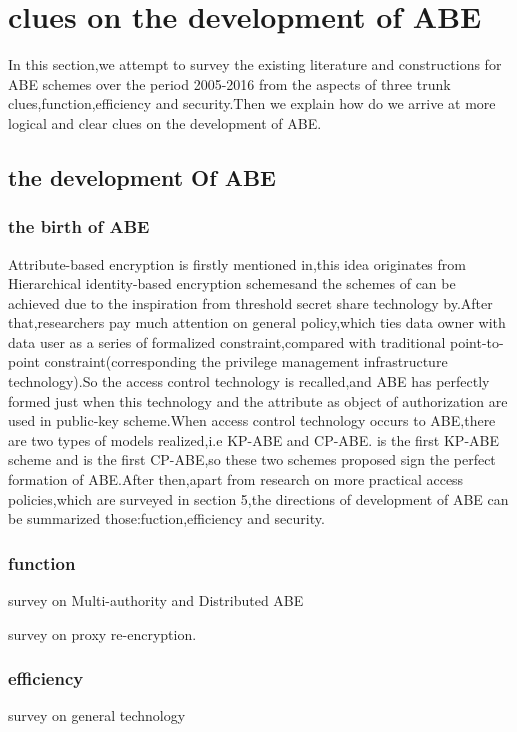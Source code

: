\section{clues on the development of ABE}
In this section,we attempt to survey the existing literature and constructions for ABE schemes over the period 2005-2016 from the aspects of three trunk clues,function,efficiency and security.Then we explain how do we arrive at more  logical and clear clues on the development of ABE.
\subsection{the development Of ABE}
\subsubsection{the birth of ABE}Attribute-based encryption is firstly mentioned in\cite{fuzz},this idea originates from Hierarchical identity-based encryption schemes\cite{Yao:Id-based encryption for complex hierarchies with applications to forward security and broadcast encryption}and the schemes of \cite{fuzz} can be achieved due to the inspiration from threshold secret share technology by\cite{ Adi Shamir:How to Share a Secret}.After that,researchers pay much attention on general policy,which ties data owner with data user as a series of formalized constraint,compared with traditional point-to-point constraint(corresponding the privilege management infrastructure technology).So the access control technology is recalled,and ABE has perfectly formed just when this technology and the attribute as object of authorization are used in public-key scheme.When access control technology occurs to ABE,there are two types of models realized,i.e KP-ABE and CP-ABE.\cite{classical:KP-ABE} is the first KP-ABE scheme and \cite{first:CP-ABE} is the first CP-ABE,so these two schemes proposed sign the perfect formation of ABE.After then,apart from research on more practical access policies,which are surveyed in section 5,the directions of development of ABE can be summarized those:fuction,efficiency and security.
\subsubsection{function}
survey on Multi-authority and Distributed ABE

survey on proxy re-encryption.
\subsubsection{efficiency}
survey on general technology

